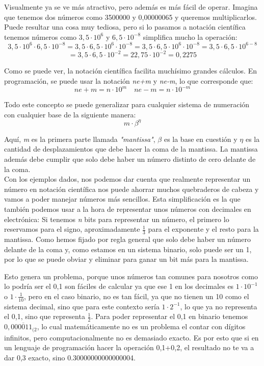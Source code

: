 \documentclass[12pt]{article}
\begin{document}
Visualmente ya se ve más atractivo, pero además es más fácil de operar. Imagina que tenemos dos números como 3500000 y 0,00000065 y queremos multiplicarlos. Puede resultar una cosa muy tediosa, pero si lo pasamos a notación científica tenemos números como \(3,5 \cdot 10^{6}\) y \(6,5 \cdot 10^{-8} \) simplifica mucho la operación:
\[
    3,5 \cdot 10^{6} \cdot 6,5 \cdot 10^{-8} = 3,5 \cdot 6,5 \cdot 10^{6} \cdot 10^{-8} = 3,5 \cdot 6,5 \cdot 10^{6} \cdot 10^{-8} = 3,5 \cdot 6,5 \cdot 10^{6 - 8}
\]
\[
    = 3,5 \cdot 6,5 \cdot 10^{-2} = 22,75 \cdot 10^{-2} = 0,2275
\]

Como se puede ver, la notación científica facilita muchísimo grandes cálculos. En programación, se puede usar la notación \emph{ne+m} y \emph{ne-m}, lo que corresponde que:
\[
    ne+m = n \cdot 10^m \quad ne-m = n \cdot 10^{-m}
\]

Todo este concepto se puede generalizar para cualquier sistema de numeración con cualquier base de la siguiente manera:
\[
    m \cdot \beta^\eta
\]

Aquí, \emph{m} es la primera parte llamada \emph{"mantissa"}, \(\beta\) es la base en cuestión y \(\eta\) es la cantidad de desplazamientos que debe hacer la coma de la mantissa. La mantissa además debe cumplir que solo debe haber un número distinto de cero delante de la coma.
\\

Con los ejemplos dados, nos podemos dar cuenta que realmente representar un número en notación científica nos puede ahorrar muchos quebraderos de cabeza y vamos a poder manejar números más sencillos. Esta simplificación es la que también podemos usar a la hora de representar unos números con decimales en electrónica: Si tenemos \emph{n} bits para representar un número, el primero lo reservamos para el signo, aproximadamente \(\frac{1}{3}\) para el exponente y el resto para la mantissa. Como hemos fijado por regla general que solo debe haber un número delante de la coma y, como estamos en un sistema binario, solo puede ser un 1, por lo que se puede obviar y eliminar para ganar un bit más para la mantissa.

Esto genera un problema, porque unos números tan comunes para nosotros como lo podría ser el 0,1 son fáciles de calcular ya que ese 1 en los decimales es \(1 \cdot 10^{-1}\) o \(1 \cdot \frac{1}{10}\), pero en el caso binario, no es tan fácil, ya que no tienen un 10 como el sistema decimal, sino que para este contexto sería \(1 \cdot 2^{-1}\), lo que ya no representa el 0,1, sino que representa \(\frac{1}{2}\). Para poder representar el 0,1 en binario tenemos \(0{,}0 \overline{00011}_{(2} \), lo cual matemáticamente no es un problema el contar con dígitos infinitos, pero computacionalmente no es demasiado exacto. Es por esto que si en un lenguaje de programación hacer la operación 0,1+0,2, el resultado no te va a dar 0,3 exacto, sino 0.30000000000000004.
\end{document}
